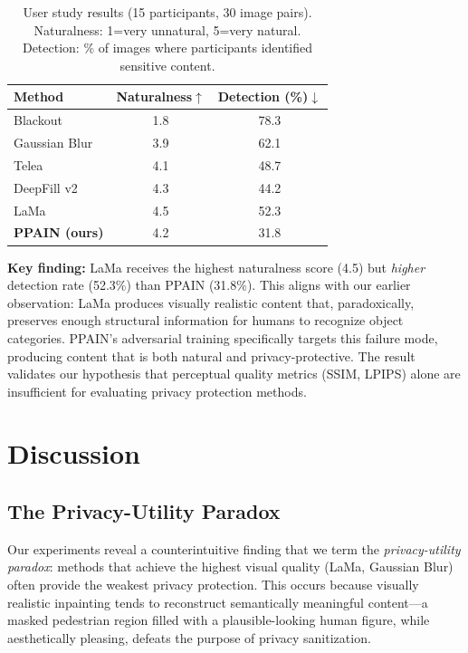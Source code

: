 \documentclass[preprint,12pt]{elsarticle}
\begin{document}
\begin{table}[t]
\centering
\caption{User study results (15 participants, 30 image pairs). Naturalness: 1=very unnatural, 5=very natural. Detection: \% of images where participants identified sensitive content.}
\label{tab:user}
\begin{tabular}{lcc}
\toprule
\textbf{Method} & \textbf{Naturalness}$\uparrow$ & \textbf{Detection (\%)}$\downarrow$ \\
\midrule
Blackout & 1.8 & 78.3 \\
Gaussian Blur & 3.9 & 62.1 \\
Telea & 4.1 & 48.7 \\
DeepFill v2 & 4.3 & 44.2 \\
LaMa & 4.5 & 52.3 \\
\midrule
\textbf{PPAIN (ours)} & 4.2 & 31.8 \\
\bottomrule
\end{tabular}
\end{table}

\textbf{Key finding:} LaMa receives the highest naturalness score (4.5) but \emph{higher} detection rate (52.3\%) than PPAIN (31.8\%). This aligns with our earlier observation: LaMa produces visually realistic content that, paradoxically, preserves enough structural information for humans to recognize object categories. PPAIN's adversarial training specifically targets this failure mode, producing content that is both natural and privacy-protective. The result validates our hypothesis that perceptual quality metrics (SSIM, LPIPS) alone are insufficient for evaluating privacy protection methods.


\section{Discussion}
\label{sec:discussion}

\subsection{The Privacy-Utility Paradox}

Our experiments reveal a counterintuitive finding that we term the \emph{privacy-utility paradox}: methods that achieve the highest visual quality (LaMa, Gaussian Blur) often provide the weakest privacy protection. This occurs because visually realistic inpainting tends to reconstruct semantically meaningful content---a masked pedestrian region filled with a plausible-looking human figure, while aesthetically pleasing, defeats the purpose of privacy sanitization.
\end{document}
